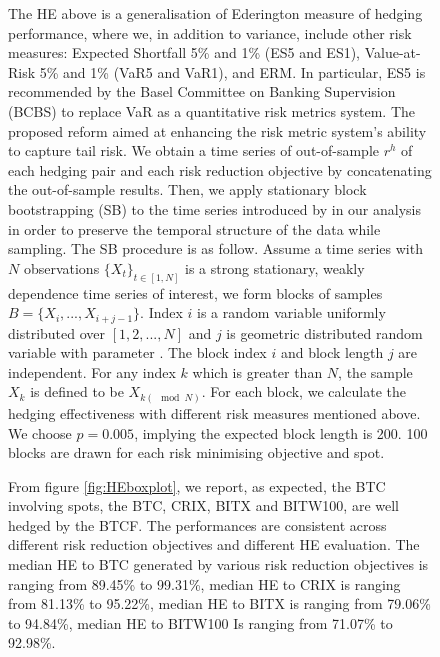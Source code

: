 \begin{figure}[!]
The HE above is a generalisation of Ederington measure of hedging performance, where we,
in addition to variance, include other risk measures: Expected Shortfall 5\% and 1\% (ES5 and ES1), Value-at-Risk 5\% and 1\% (VaR5 and VaR1), and ERM.
In particular, ES5 is recommended by the Basel Committee on Banking Supervision (BCBS) to replace VaR as a quantitative risk metrics system.
The proposed reform aimed at enhancing the risk metric system's ability to capture tail risk. \medskip
%
We obtain a time series of out-of-sample $r^h$ of each hedging pair and each risk reduction objective by concatenating the out-of-sample results.
Then, we apply stationary block bootstrapping (SB) to the time series introduced by \cite{Politis1994} in our analysis in order to preserve the temporal structure of the data while sampling.
The SB procedure is as follow.
Assume a time series with $N$ observations $\{X_t\}_{t \in [1,N]}$ is a strong stationary, weakly dependence time series of interest,
we form blocks of samples $B = \{X_i, ..., X_{i+j-1}\}$.
Index $i$ is a random variable uniformly distributed over $[1,2,...,N]$ and $j$ is geometric distributed random variable with parameter .
The block index $i$ and block length $j$ are independent.
For any index $k$ which is greater than $N$, the sample $X_k$ is defined to be $X_{k(\mod N)}$.
For each block, we calculate the hedging effectiveness with different risk measures mentioned above.
We choose $p=0.005$, implying the expected block length is 200.
100 blocks are drawn for each risk minimising objective and spot. \medskip

From figure \ref{fig:HEboxplot}, we report, as expected, the BTC involving spots, the BTC, CRIX, BITX and BITW100, are well hedged by the BTCF.
The performances are consistent across different risk reduction objectives and different HE evaluation.
The median HE to BTC generated by various risk reduction objectives is ranging from 89.45\% to 99.31\%, median HE to CRIX is ranging from 81.13\% to 95.22\%,
median HE to BITX is ranging from 79.06\% to 94.84\%, median HE to BITW100 Is ranging from 71.07\% to 92.98\%. \medskip


\end{figure}
